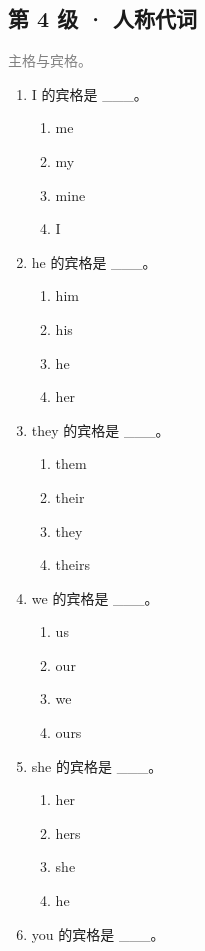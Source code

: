 \documentclass[11pt,a4paper]{ctexart}
\begin{document}
\subsection*{第 4 级 · 人称代词}
\noindent\textcolor{gray}{主格与宾格。}\par\smallskip
\begin{enumerate}[leftmargin=*,itemsep=4pt]
\item I 的宾格是 \_\_\_。
\begin{enumerate}[label=\Alph*.,leftmargin=2em,itemsep=1pt,topsep=2pt]
\item me
\item my
\item mine
\item I
\end{enumerate}
\item he 的宾格是 \_\_\_。
\begin{enumerate}[label=\Alph*.,leftmargin=2em,itemsep=1pt,topsep=2pt]
\item him
\item his
\item he
\item her
\end{enumerate}
\item they 的宾格是 \_\_\_。
\begin{enumerate}[label=\Alph*.,leftmargin=2em,itemsep=1pt,topsep=2pt]
\item them
\item their
\item they
\item theirs
\end{enumerate}
\item we 的宾格是 \_\_\_。
\begin{enumerate}[label=\Alph*.,leftmargin=2em,itemsep=1pt,topsep=2pt]
\item us
\item our
\item we
\item ours
\end{enumerate}
\item she 的宾格是 \_\_\_。
\begin{enumerate}[label=\Alph*.,leftmargin=2em,itemsep=1pt,topsep=2pt]
\item her
\item hers
\item she
\item he
\end{enumerate}
\item you 的宾格是 \_\_\_。

\end{enumerate}
\end{document}
